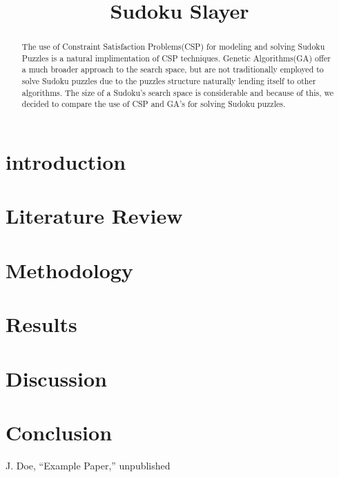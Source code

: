 \documentclass[10pt, conference]{IEEEtran}
\begin{document}
\title{Sudoku Slayer}

\author{
\and
{}
}

\maketitle

\begin{abstract}

The use of Constraint Satisfaction Problems(CSP) for modeling and solving Sudoku Puzzles is a natural implimentation of CSP techniques.
Genetic Algorithms(GA) offer a much broader approach to the search space, but are not traditionally employed to solve Sudoku puzzles due to the puzzles structure naturally lending itself to other algorithms.
The size of a Sudoku's search space is considerable and because of this, we decided to compare the use of CSP and GA's for solving Sudoku puzzles.

\end{abstract}

\section{introduction}

\section{Literature Review}

\section{Methodology}

\section{Results}

\section{Discussion}

\section{Conclusion}

\begin{thebibliography}{00}
J. Doe, ``Example Paper,'' unpublished
\end{thebibliography}
\end{document}
